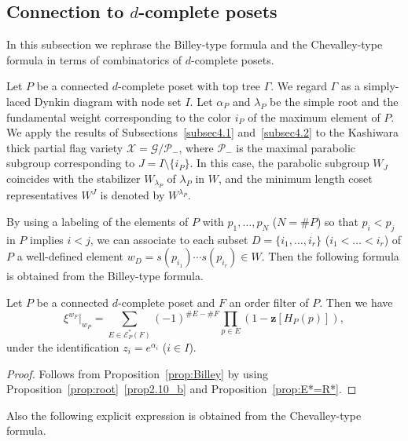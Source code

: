 \documentclass[ALCO,ThmDefs,Unicode,epreuves]{cedram}
\newcommand\vectz{\boldsymbol{z}}
\newcommand\EE{\mathcal{E}}
\newcommand\GG{\mathcal{G}}
\newcommand\PP{\mathcal{P}}
\newcommand\XX{\mathcal{X}}
\begin{document}
\subsection{%
Connection to \texorpdfstring{$d$}{d}-complete posets
}\label{subsec4.3}

In this subsection we rephrase the Billey-type formula and the Chevalley-type formula 
in terms of combinatorics of $d$-complete posets.

Let $P$ be a connected $d$-complete poset with top tree $\Gamma$.
We regard $\Gamma$ as a simply-laced Dynkin diagram with node set $I$.
Let $\alpha_P$ and $\lambda_P$ be the simple root and the fundamental weight 
corresponding to the color $i_P$ of the maximum element of $P$.
We apply the results of Subsections~\ref{subsec4.1} and~\ref{subsec4.2} 
to the Kashiwara thick partial flag variety 
$\XX = \GG/\PP_-$, where $\PP_-$ is the maximal parabolic subgroup corresponding 
to $J = I \setminus \{ i_P \}$.
In this case, the parabolic subgroup $W_J$ coincides with the stabilizer $W_{\lambda_P}$ of $\lambda_P$ in $W$, 
and the minimum length coset representatives $W^J$ is denoted by $W^{\lambda_P}$.

By using a labeling of the elements of $P$ with $p_1, \ldots, p_N$ ($N= \# P$) 
so that $p_i < p_j$ in $P$ implies $i<j$, 
we can associate to each subset $D = \{ i_1, \dots, i_r \}$ ($i_1 < \dots < i_r$) of $P$ 
a well-defined element $w_D = s(p_{i_1}) \cdots s(p_{i_r}) \in W$.
Then the following formula is obtained from the Billey-type formula.

\begin{prop}
\label{prop:Billey_P}
Let $P$ be a connected $d$-complete poset and $F$ an order filter of $P$.
Then we have
\begin{equation}
\label{eq:Billey_P}
\xi^{w_F}|_{w_P}
 =
\sum_{E \in \EE^*_P(F)}
 (-1)^{\# E - \# F}
 \prod_{p \in E} \left( 1 - \vectz[H_P(p)] \right),
\end{equation}
under the identification $z_i = e^{\alpha_i}$ \textup{(}$i \in I$\textup{)}.
\end{prop}

\begin{proof}
Follows from Proposition~\ref{prop:Billey} 
by using Proposition~\ref{prop:root}~\ref{prop2.10_b} and Proposition~\ref{prop:E*=R*}.
\end{proof}

Also the following explicit expression is obtained from the Chevalley-type formula.
\end{document}
